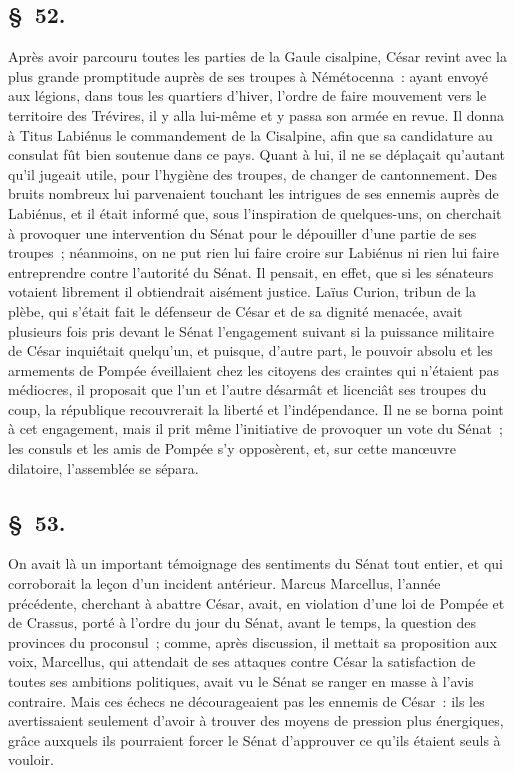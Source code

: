 \documentclass[french,twoside]{book} %
\begin{document}
\subsection[{§ 52.}]{ \textsc{§ 52.} }
\noindent Après avoir parcouru toutes les parties de la Gaule cisalpine, César revint avec la plus grande promptitude auprès de ses troupes à Némétocenna : ayant envoyé aux légions, dans tous les quartiers d’hiver, l’ordre de faire mouvement vers le territoire des Trévires, il y alla lui-même et y passa son armée en revue. Il donna à Titus Labiénus le commandement de la Cisalpine, afin que sa candidature au consulat fût bien soutenue dans ce pays. Quant à lui, il ne se déplaçait qu’autant qu’il jugeait utile, pour l’hygiène des troupes, de changer de cantonnement. Des bruits nombreux lui parvenaient touchant les intrigues de ses ennemis auprès de Labiénus, et il était informé que, sous l’inspiration de quelques-uns, on cherchait à provoquer une intervention du Sénat pour le dépouiller d’une partie de ses troupes ; néanmoins, on ne put rien lui faire croire sur Labiénus ni rien lui faire entreprendre contre l’autorité du Sénat. Il pensait, en effet, que si les sénateurs votaient librement il obtiendrait aisément justice. Laïus Curion, tribun de la plèbe, qui s’était fait le défenseur de César et de sa dignité menacée, avait plusieurs fois pris devant le Sénat l’engagement suivant si la puissance militaire de César inquiétait quelqu’un, et puisque, d’autre part, le pouvoir absolu et les armements de Pompée éveillaient chez les citoyens des craintes qui n’étaient pas médiocres, il proposait que l’un et l’autre désarmât et licenciât ses troupes du coup, la république recouvrerait la liberté et l’indépendance. Il ne se borna point à cet engagement, mais il prit même l’initiative de provoquer un vote du Sénat ; les consuls et les amis de Pompée s’y opposèrent, et, sur cette manœuvre dilatoire, l’assemblée se sépara.
\subsection[{§ 53.}]{ \textsc{§ 53.} }
\noindent On avait là un important témoignage des sentiments du Sénat tout entier, et qui corroborait la leçon d’un incident antérieur. Marcus Marcellus, l’année précédente, cherchant à abattre César, avait, en violation d’une loi de Pompée et de Crassus, porté à l’ordre du jour du Sénat, avant le temps, la question des provinces du proconsul ; comme, après discussion, il mettait sa proposition aux voix, Marcellus, qui attendait de ses attaques contre César la satisfaction de toutes ses ambitions politiques, avait vu le Sénat se ranger en masse à l’avis contraire. Mais ces échecs ne décourageaient pas les ennemis de César : ils les avertissaient seulement d’avoir à trouver des moyens de pression plus énergiques, grâce auxquels ils pourraient forcer le Sénat d’approuver ce qu’ils étaient seuls à vouloir.
\end{document}
